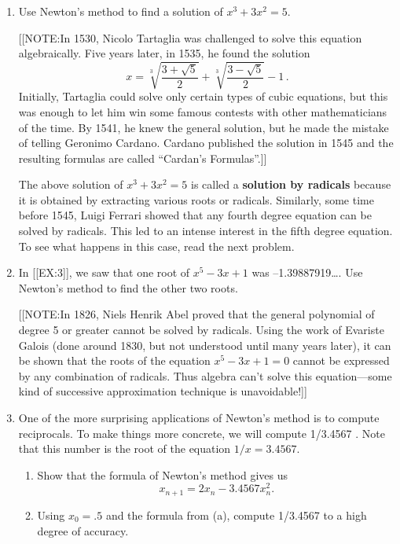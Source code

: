 \begin{enumerate}
\item Use Newton's method to find a solution of $x^3+3x^2=5$.

[[NOTE:In 1530, Nicolo Tartaglia was
  challenged to solve this equation algebraically.  Five years later,
  in 1535, he found the solution
\[
x = \sqrt[3]{\frac{3+\sqrt{5}}{2}}+\sqrt[3]{\frac{3-\sqrt{5}}{2}}-1 \, .
\]
Initially, Tartaglia could solve only certain types of cubic
equations, but this was enough to let him win some famous contests
with other mathematicians of the time.  By 1541, he knew the general
solution, but he made the mistake of telling Geronimo
Cardano.  Cardano published the solution in
1545 and the resulting formulas are called ``Cardan's
Formulas''.]]

The above solution of $x^3+3x^2=5$ is called a {\bf solution by
  radicals} because it is obtained by
extracting various roots or radicals.  Similarly, some time before
1545, Luigi Ferrari showed that any fourth
degree equation can be solved by radicals.  This led to an intense
interest in the fifth degree equation.  To see what happens in this
case, read the next problem.


\item In [[EX:3]], we saw that one root of $x^5-3x+1$ was
--1.39887919\ldots . Use Newton's method to find the other two roots.

[[NOTE:In 1826, Niels Henrik Abel proved that the
  general polynomial of degree 5 or greater cannot be solved by
  radicals.  Using the work of Evariste Galois
  (done around 1830, but not understood until many years later), it
  can be shown that the roots of the equation $x^5-3x+1=0$ cannot be
  expressed by any combination of radicals.  Thus algebra can't solve
  this equation---some kind of successive approximation technique is
  unavoidable!]]


\item One of the more surprising applications of Newton's method is to
compute reciprocals.  To make things more concrete, we will compute
1/3.4567 .  Note that this number is the root of the equation $1/x =
3.4567$.

  \begin{enumerate}
  \item Show that the formula of Newton's method gives us
\[
x_{n+1} = 2 x_n-3.4567 x_n^2.
\]


  \item Using $x_0=.5$ and the formula from (a), compute 1/3.4567 to a
high degree of accuracy.


\end{enumerate}
\end{enumerate}
